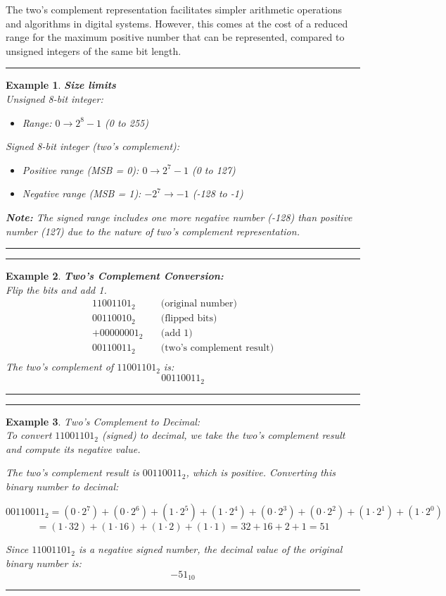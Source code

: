 \documentclass[12pt]{report}
\newtheorem{example}{Example}
\newenvironment{examp}
{
    \vspace{0.5cm}
    \hrule
    \begin{example}
}
{
    \hrule
    \vspace{0.5cm}
    \end{example}
}
\begin{document}
The two's complement representation facilitates simpler arithmetic operations and algorithms in digital systems. However, this comes at the cost of a reduced range for the maximum positive number that can be represented, compared to unsigned integers of the same bit length.
\begin{examp}
	\textbf{Size limits} \\
	Unsigned 8-bit integer:
	\begin{itemize}
		\item Range: $0 \to 2^8 - 1$ (0 to 255)
	\end{itemize}
	Signed 8-bit integer (two's complement):
	\begin{itemize}
		\item Positive range (MSB = 0): $0 \to 2^7 - 1$ (0 to 127)
		\item Negative range (MSB = 1): $-2^7 \to -1$ (-128 to -1)
	\end{itemize}
	\noindent\textbf{Note:} The signed range includes one more negative number (-128) than positive number (127) due to the nature of two's complement representation.
\end{examp}
\begin{examp}
	\textbf{Two's Complement Conversion:} \\
	Flip the bits and add 1.
	\[
		\begin{aligned}
			11001101_2  & \quad \text{(original number)}         \\
			00110010_2  & \quad \text{(flipped bits)}            \\
			+00000001_2 & \quad \text{(add 1)}                   \\
			\hline
			00110011_2  & \quad \text{(two's complement result)} \\
		\end{aligned}
	\]
	The two's complement of \(11001101_2\) is:
	\[
		00110011_2
	\]
\end{examp}
\pagebreak
\begin{examp}
	Two's Complement to Decimal: \\
	To convert \(11001101_2\) (signed) to decimal, we take the two's complement result and compute its negative value.

	The two's complement result is \(00110011_2\), which is positive. Converting this binary number to decimal:

	\[
		00110011_2 = (0 \cdot 2^7) + (0 \cdot 2^6) + (1 \cdot 2^5) + (1 \cdot 2^4) + (0 \cdot 2^3) + (0 \cdot 2^2) + (1 \cdot 2^1) + (1 \cdot 2^0)
	\]
	\[
		= (1 \cdot 32) + (1 \cdot 16) + (1 \cdot 2) + (1 \cdot 1) = 32 + 16 + 2 + 1 = 51
	\]

	Since \(11001101_2\) is a negative signed number, the decimal value of the original binary number is:
	\[-51_{10}\]
\end{examp}
\end{document}
